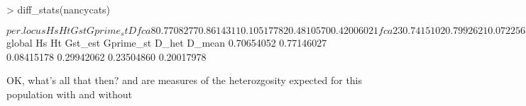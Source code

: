 \documentclass{article}
\begin{document}
\begin{Schunk}
\begin{Sinput}
> diff_stats(nancycats)
\end{Sinput}
\begin{Soutput}
$per.locus
             Hs        Ht        Gst Gprime_st          D
fca8  0.7708277 0.8614311 0.10517782 0.4810570 0.42006021
fca23 0.7415102 0.7992621 0.07225650 0.2924881 0.23738411
fca43 0.7416796 0.7935120 0.06532017 0.2645865 0.21319208
fca45 0.7273320 0.7641204 0.04814486 0.1845960 0.14335289
fca77 0.7766369 0.8655618 0.10273670 0.4822798 0.42300076
fca78 0.6316202 0.6772045 0.06731245 0.1899390 0.13147655
fca90 0.7369587 0.8141591 0.09482221 0.3770880 0.31183460
fca96 0.6699736 0.7654561 0.12473941 0.3937947 0.30740024
fca37 0.5623259 0.6024354 0.06657894 0.1574662 0.09737005

$global
        Hs         Ht    Gst_est  Gprime_st      D_het     D_mean 
0.70654052 0.77146027 0.08415178 0.29942062 0.23504860 0.20017978 
\end{Soutput}
\end{Schunk}

OK, what's all that then? \verb@Hs@ and \verb@Ht@ are measures of the 
heterozgosity expected for this population with and without 
\end{document}
